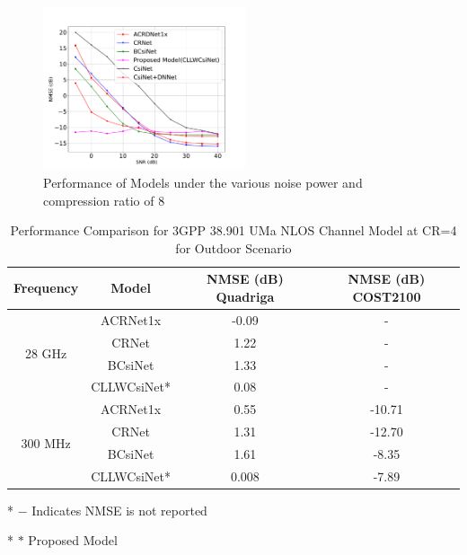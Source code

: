 \documentclass[lettersize,journal]{IEEEtran}
\begin{document}
\begin{figure}
	\centering
	\includegraphics[width=0.53\textwidth]{Figure_1.pdf}
	\caption{Performance of Models under the various noise power and compression ratio of 8}
	\label{fig:Performance of Models under the various noise power}
\end{figure}








	
	\begin{table}[ht]
		\centering
		\caption{Performance Comparison for 3GPP 38.901 UMa NLOS Channel Model at CR=4 for Outdoor Scenario}
		\label{table:performance_comparison}
		\begin{threeparttable}
			\begin{tabular}{cccc}
				\toprule
				\textbf{Frequency} & \textbf{Model} & \textbf{NMSE (dB) Quadriga} & \textbf{NMSE (dB) COST2100} \\
				\midrule
				\multirow{4}{*}{28 GHz} & ACRNet1x\cite{abx} & -0.09 & - \\
				& CRNet\cite{abn} & 1.22 & - \\
				& BCsiNet\cite{abp} & 1.33 & - \\
				& CLLWCsiNet* & 0.08 & - \\
				\midrule
				\multirow{4}{*}{300 MHz} & ACRNet1x\cite{abx} & 0.55 & -10.71 \\
				& CRNet\cite{abn} & 1.31 & -12.70 \\
				& BCsiNet\cite{abp} & 1.61 & -8.35 \\
				& CLLWCsiNet* & 0.008 & -7.89 \\
				\bottomrule
			\end{tabular}
			\begin{tablenotes}
				\item[*] $ -$ Indicates NMSE is not reported
				\item[*] $ *$ Proposed Model
			\end{tablenotes}
		\end{threeparttable}
	\end{table}
	
\end{document}
